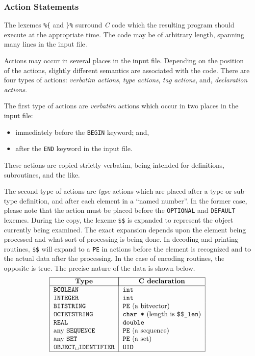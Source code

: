 \subsubsection	{Action Statements}
The lexemes \verb"%{" and \verb"}%" surround {\em C\/} code which the
resulting program should execute at the appropriate time.
The code may be of arbitrary length,
spanning many lines in the input file.

Actions may occur in several places in the input file.
Depending on the position of the actions,
slightly different semantics are associated with the code.
There are four types of actions:
{\em verbatim actions}, {\em type actions}, {\em tag actions}, and,
{\em declaration actions}.

The first type of actions are {\em verbatim\/} actions which occur in two
places in the input file:
\begin{itemize}
\item	immediately before the \verb"BEGIN" keyword; and,

\item	after the \verb"END" keyword in the input file.
\end{itemize}
These actions are copied strictly verbatim,
being intended for definitions, subroutines, and the like.

The second type of actions are {\em type\/} actions which are placed after a
type or sub-type definition, and after each element in a ``named number''.
In the former case,
please note that the action must be placed before the \verb"OPTIONAL"
and \verb"DEFAULT" lexemes.
During the copy,
the lexeme \verb"$$" is expanded to represent the object currently being
examined. The exact expansion depends upon the element being processed
and what sort of processing is being done. In decoding and printing routines,
\verb"$$" will expand to a \verb"PE" in actions before the element is
recognized and to the actual data after the processing. In the case of
encoding routines, the opposite is true. The precise
nature of the data is shown below.
\[\begin{tabular}{|l|l|}
\hline
    \multicolumn{1}{|c|}{\bf Type}&
			\multicolumn{1}{|c|}{\bf C declaration}\\
\hline
    \verb"BOOLEAN"&		\verb"int"\\
    \verb"INTEGER"&		\verb"int"\\
    \verb"BITSTRING"&		\verb"PE" (a bitvector)\\
    \verb"OCTETSTRING"&		\verb"char *" (length is \verb"$$_len")\\
    \verb"REAL"&		\verb"double"\\
    any \verb"SEQUENCE"&	\verb"PE" (a sequence)\\
    any \verb"SET"&		\verb"PE" (a set)\\
    \verb*"OBJECT IDENTIFIER"&	\verb"OID"\\
\hline
\end{tabular}\]

